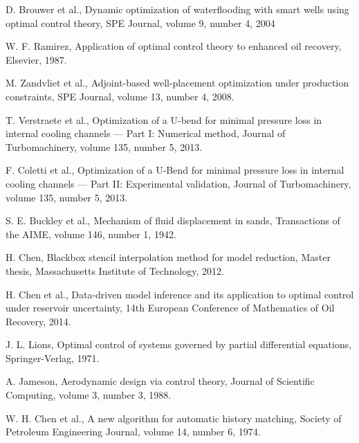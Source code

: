 \documentclass[a4paper,onecolumn]{article}
\theoremstyle{remark}
\begin{document}
\newpage
\begin{thebibliography}{1}
D. Brouwer et al.,
Dynamic optimization of waterflooding with smart wells using optimal control theory,
{SPE Journal},
volume 9, number 4, 2004

W. F. Ramirez,
Application of optimal control theory to enhanced oil recovery,
Elsevier, 1987.

M. Zandvliet et al.,
Adjoint-based well-placement optimization under production constraints,
{SPE Journal}, volume 13, number 4, 2008.


T. Verstraete et al., 
Optimization of a U-bend for minimal pressure loss in internal cooling channels — Part I: Numerical method,
{Journal of Turbomachinery},
volume 135, number 5, 2013.

F. Coletti et al.,
Optimization of a U-Bend for minimal pressure loss in internal cooling channels — Part II: Experimental validation,
{Journal of Turbomachinery},
volume 135, number 5, 2013.

S. E. Buckley et al.,
Mechanism of fluid displacement in sands,
{Transactions of the AIME},
volume 146, number 1, 1942.

H. Chen,
Blackbox stencil interpolation method for model reduction,
Master thesis, Massachusetts Institute of Technology, 2012.

H. Chen et al.,
Data-driven model inference and its application to optimal control under reservoir uncertainty,
14th European Conference of Mathematics of Oil Recovery, 2014.

J. L. Lions,
Optimal control of systems governed by partial differential equations,
{Springer-Verlag}, 1971.

A. Jameson,
Aerodynamic design via control theory,
{Journal of Scientific Computing},
volume 3, number 3, 1988.

W. H. Chen et al.,
A new algorithm for automatic history matching,
{Society of Petroleum Engineering Journal},
volume 14, number 6, 1974.


\end{thebibliography}
\end{document}
